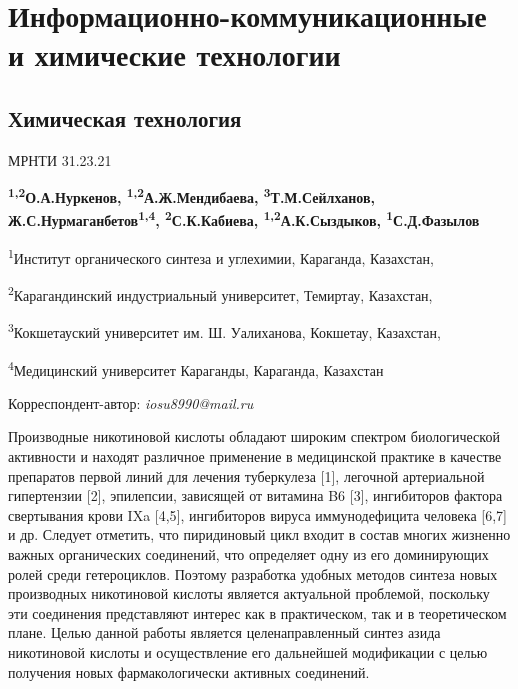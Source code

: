 \let\cleardoublepage\clearpage
\part{Информационно-коммуникационные и химические технологии}
\chapter{Химическая технология}
МРНТИ 31.23.21


\begin{center}
{\bfseries \textsuperscript{1,2}О.А.Нуркенов, \textsuperscript{1,2}А.Ж.Мендибаева, \textsuperscript{3}Т.М.Сейлханов, Ж.С.Нурмаганбетов\textsuperscript{1,4}, \textsuperscript{2}С.К.Кабиева, \textsuperscript{1,2}А.К.Сыздыков, \textsuperscript{1}С.Д.Фазылов}

\textsuperscript{1}Институт органического синтеза и углехимии,
Караганда, Казахстан,

\textsuperscript{2}Карагандинский индустриальный университет, Темиртау,
Казахстан,

\textsuperscript{3}Кокшетауский университет им. Ш. Уалиханова, Кокшетау,
Казахстан,

\textsuperscript{4}Медицинский университет Караганды, Караганда,
Казахстан

Корреспондент-автор: \emph{iosu8990@mail.ru}
\end{center}

Производные никотиновой кислоты обладают широким спектром биологической
активности и находят различное применение в медицинской практике в
качестве препаратов первой линий для лечения туберкулеза {[}1{]},
легочной артериальной гипертензии {[}2{]}, эпилепсии, зависящей от
витамина B6 {[}3{]}, ингибиторов фактора свертывания крови IXa
{[}4,5{]}, ингибиторов вируса иммунодефицита человека {[}6,7{]} и др.
Следует отметить, что пиридиновый цикл входит в состав многих жизненно
важных органических соединений, что определяет одну из его доминирующих
ролей среди гетероциклов. Поэтому разработка удобных методов синтеза
новых производных никотиновой кислоты является актуальной проблемой,
поскольку эти соединения представляют интерес как в практическом, так и
в теоретическом плане. Целью данной работы является целенаправленный
синтез азида никотиновой кислоты и осуществление его дальнейшей
модификации с целью получения новых фармакологически активных
соединений.

